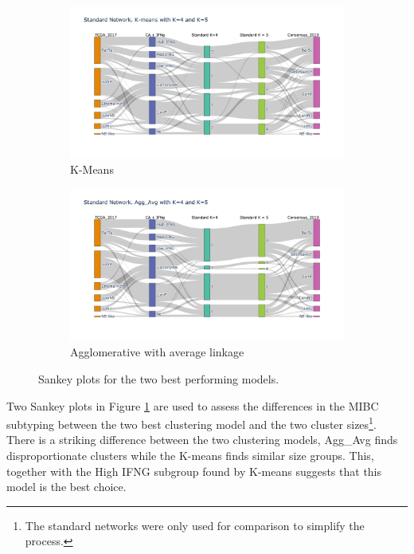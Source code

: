 \begin{figure}[!htb]
    \hfill
    \begin{subfigure}[b]{0.49\textwidth}
        \centering
        \includegraphics[width=\textwidth,keepaspectratio]{Sections/Network_I/Resources/P0/Sankey_KM_4K.png}
        \caption{K-Means}
    \end{subfigure}
    \hfill
    \begin{subfigure}[b]{0.49\textwidth}
        \centering
        \includegraphics[width=\textwidth,keepaspectratio]{Sections/Network_I/Resources/P0/Sankey_Avg_4K.png}
        \caption{Agglomerative with average linkage}
    \end{subfigure}
    \hfill
    \caption{Sankey plots for the two best performing models. }
    \label{fig:N_I:p0_sky_Agg_KMeans}
\end{figure}


Two Sankey plots in Figure \ref{fig:N_I:p0_sky_Agg_KMeans} are used to assess the differences in the MIBC subtyping between the two best clustering model and the two cluster sizes\footnote{The standard networks were only used for comparison to simplify the process.}. There is a striking difference between the two clustering models, Agg\_Avg finds disproportionate clusters while the K-means finds similar size groups. This, together with the High IFNG subgroup found by K-means suggests that this model is the best choice. 


